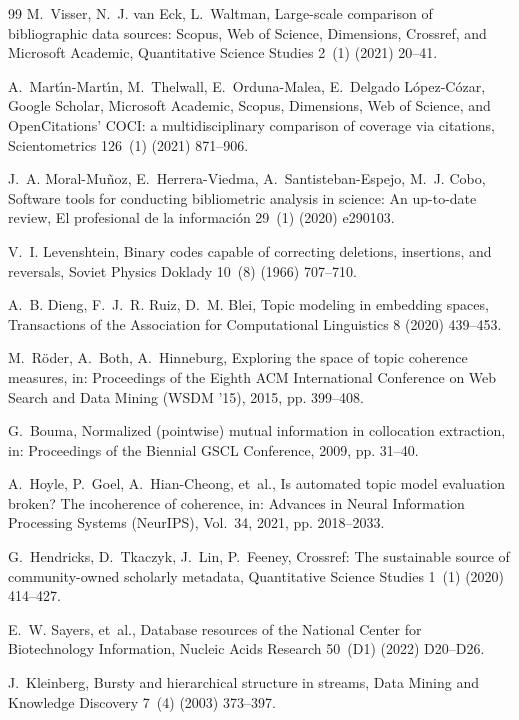 \documentclass[preprint,12pt]{elsarticle}
\begin{document}
\begin{thebibliography}{99}
M.~Visser, N.~J. van Eck, L.~Waltman, Large-scale comparison of bibliographic data sources: Scopus, Web of Science, Dimensions, Crossref, and Microsoft Academic, Quantitative Science Studies 2~(1) (2021) 20--41.

A.~Mart{\'\i}n-Mart{\'\i}n, M.~Thelwall, E.~Orduna-Malea, E.~Delgado L{\'o}pez-C{\'o}zar, Google Scholar, Microsoft Academic, Scopus, Dimensions, Web of Science, and OpenCitations’ COCI: a multidisciplinary comparison of coverage via citations, Scientometrics 126~(1) (2021) 871--906.

J.~A. Moral-Mu{\~n}oz, E.~Herrera-Viedma, A.~Santisteban-Espejo, M.~J. Cobo, Software tools for conducting bibliometric analysis in science: An up-to-date review, El profesional de la informaci{\'o}n 29~(1) (2020) e290103.

V.~I. Levenshtein, Binary codes capable of correcting deletions, insertions, and reversals, Soviet Physics Doklady 10~(8) (1966) 707--710.

A.~B. Dieng, F.~J.~R. Ruiz, D.~M. Blei, Topic modeling in embedding spaces, Transactions of the Association for Computational Linguistics 8 (2020) 439--453.

M.~R{\"o}der, A.~Both, A.~Hinneburg, Exploring the space of topic coherence measures, in: Proceedings of the Eighth ACM International Conference on Web Search and Data Mining (WSDM '15), 2015, pp. 399--408.

G.~Bouma, Normalized (pointwise) mutual information in collocation extraction, in: Proceedings of the Biennial GSCL Conference, 2009, pp. 31--40.

A.~Hoyle, P.~Goel, A.~Hian-Cheong, et~al., Is automated topic model evaluation broken? The incoherence of coherence, in: Advances in Neural Information Processing Systems (NeurIPS), Vol.~34, 2021, pp. 2018--2033.

G.~Hendricks, D.~Tkaczyk, J.~Lin, P.~Feeney, Crossref: The sustainable source of community-owned scholarly metadata, Quantitative Science Studies 1~(1) (2020) 414--427.

E.~W. Sayers, et~al., Database resources of the National Center for Biotechnology Information, Nucleic Acids Research 50~(D1) (2022) D20--D26.

J.~Kleinberg, Bursty and hierarchical structure in streams, Data Mining and Knowledge Discovery 7~(4) (2003) 373--397.


\end{thebibliography}
\end{document}
